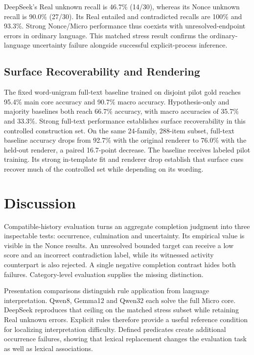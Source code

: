 \documentclass[sigconf,anonymous,review]{acmart}
\begin{document}
DeepSeek's Real unknown recall is 46.7\% (14/30), whereas its Nonce unknown recall is 90.0\% (27/30). Its Real entailed and contradicted recalls are 100\% and 93.3\%. Strong Nonce/Micro performance thus coexists with unresolved-endpoint errors in ordinary language. This matched stress result confirms the ordinary-language uncertainty failure alongside successful explicit-process inference.



\subsection{Surface Recoverability and Rendering}
The fixed word-unigram full-text baseline trained on disjoint pilot gold reaches 95.4\% main core accuracy and 90.7\% macro accuracy. Hypothesis-only and majority baselines both reach 66.7\% accuracy, with macro accuracies of 35.7\% and 33.3\%. Strong full-text performance establishes surface recoverability in this controlled construction set. On the same 24-family, 288-item subset, full-text baseline accuracy drops from 92.7\% with the original renderer to 76.0\% with the held-out renderer, a paired 16.7-point decrease. The baseline receives labeled pilot training. Its strong in-template fit and renderer drop establish that surface cues recover much of the controlled set while depending on its wording.

\section{Discussion}
Compatible-history evaluation turns an aggregate completion judgment into three inspectable tests: occurrence, culmination and uncertainty. Its empirical value is visible in the Nonce results. An unresolved bounded target can receive a low score and an incorrect contradiction label, while its witnessed activity counterpart is also rejected. A single negative completion contrast hides both failures. Category-level evaluation supplies the missing distinction.

Presentation comparisons distinguish rule application from language interpretation. Qwen8, Gemma12 and Qwen32 each solve the full Micro core. DeepSeek reproduces that ceiling on the matched stress subset while retaining Real unknown errors. Explicit rules therefore provide a useful reference condition for localizing interpretation difficulty. Defined predicates create additional occurrence failures, showing that lexical replacement changes the evaluation task as well as lexical associations.
\end{document}
